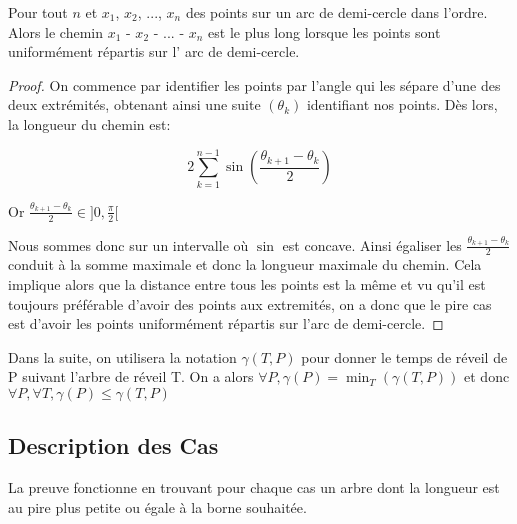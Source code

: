 \begin{lemma}\label{worstchord}
Pour tout $n$ et $x_1$, $x_2$, ..., $x_n$ des points sur un arc de demi-cercle dans l'ordre. Alors le chemin $x_1$ - $x_2$ - ... - $x_n$ est le plus long lorsque les points sont uniformément répartis sur l' arc de demi-cercle.
\end{lemma}
\begin{proof}
On commence par identifier les points par l'angle qui les sépare d'une des deux extrémités, obtenant ainsi une suite $\left(\theta_k\right)$ identifiant nos points. Dès lors, la longueur du chemin est:

$$2\sum_{k=1}^{n-1} \sin\left(\frac{\theta_{k+1} - \theta_k}{2}\right)$$

Or $\frac{\theta_{k+1} - \theta_k}{2} \in ]0, \frac{\pi}{2}[$

Nous sommes donc sur un intervalle où $\sin$ est concave. Ainsi égaliser les $\frac{\theta_{k+1} - \theta_k}{2}$ conduit à la somme maximale et donc la longueur maximale du chemin. 
Cela implique alors que la distance entre tous les points est la même et vu qu'il est toujours préférable d'avoir des points aux extremités, on a donc que le pire cas est d'avoir les points uniformément répartis sur l'arc de demi-cercle.

\end{proof}

Dans la suite, on utilisera la notation $\gamma(T, P)$ pour donner le temps de réveil de P suivant l'arbre de réveil T.
On a alors $\forall P, \gamma(P) = \min_T(\gamma(T,P))$
et donc $\forall P, \forall T, \gamma(P) \leq \gamma(T, P)$

\subsection{Description des Cas}

La preuve fonctionne en trouvant pour chaque cas un arbre dont la longueur est au pire plus petite ou égale à la borne souhaitée.

